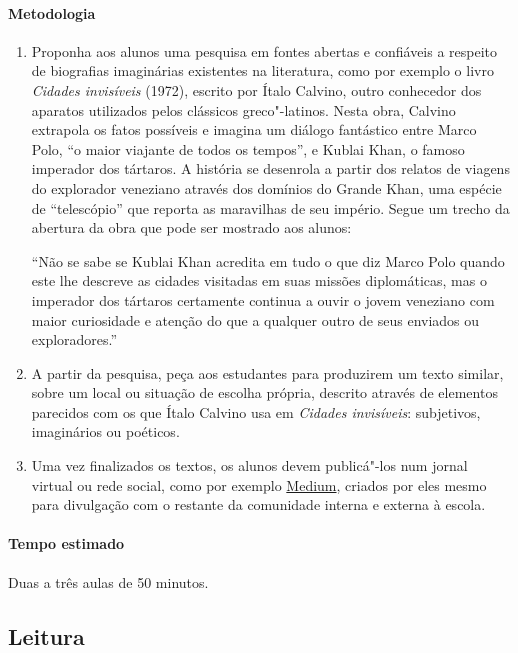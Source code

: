 \documentclass[12pt]{extarticle}
\begin{document}
 \paragraph{Metodologia}
 	\begin{enumerate}
	\item
	Proponha aos alunos uma pesquisa em fontes abertas e confiáveis a respeito de biografias
	imaginárias existentes na literatura, como por exemplo o livro \emph{Cidades invisíveis} 
	(1972), escrito por Ítalo Calvino, outro conhecedor dos aparatos utilizados pelos clássicos
	greco"-latinos. Nesta obra, Calvino extrapola os fatos possíveis 
	e imagina um diálogo fantástico entre Marco Polo, ``o maior viajante de todos os tempos'', 
	e Kublai Khan, o famoso imperador dos tártaros. A história se desenrola a partir 
	dos relatos de viagens do explorador veneziano através dos domínios do 
	Grande Khan, uma espécie de ``telescópio'' que reporta as maravilhas de seu império.
	Segue um trecho da abertura da obra que pode ser mostrado aos alunos:

``Não se sabe se Kublai Khan acredita em tudo o que diz Marco Polo quando este lhe descreve as cidades visitadas em suas missões diplomáticas, mas o imperador dos tártaros certamente continua a ouvir o jovem veneziano com maior curiosidade e atenção do que a qualquer outro de seus enviados ou exploradores.''

	\item
	A partir da pesquisa, peça aos estudantes para produzirem um texto similar, 
	sobre um local ou situação de escolha própria, descrito 
	através de elementos parecidos com os que Ítalo Calvino usa 
	em \emph{Cidades invisíveis}: subjetivos, imaginários ou poéticos.

	\item
	Uma vez finalizados os textos, os alunos devem publicá"-los num jornal virtual 
	ou rede social, como por exemplo \href{www.medium.com}{Medium},
	criados por eles mesmo para divulgação com o restante da comunidade interna e 
	externa à escola.

 	\end{enumerate}

 \paragraph{Tempo estimado} Duas a três aulas de 50 minutos.



\subsection{Leitura}
\end{document}
